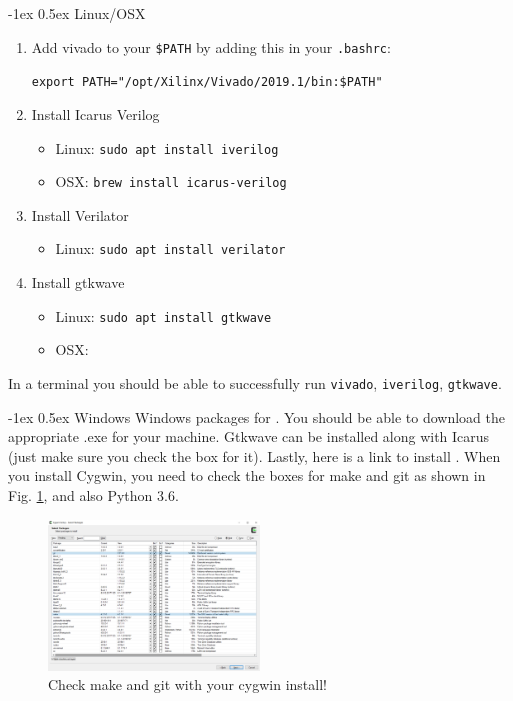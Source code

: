 \documentclass[11pt]{article}
\makeatletter
\renewcommand{\subsection}
{\@startsection {subsection}{1}{0pt}
 {-1ex}
 {0.5ex}
 {\bfseries\normalsize}}
\makeatother
\begin{document}
\subsection{Linux/OSX}
\begin{enumerate}
  \item Add vivado to your \verb|$PATH| by adding this in your \verb|.bashrc|:

    \verb|export PATH="/opt/Xilinx/Vivado/2019.1/bin:$PATH"|
  \item Install Icarus Verilog
    \begin{itemize}
      \item Linux: \verb|sudo apt install iverilog|
      \item OSX: \verb|brew install icarus-verilog|
    \end{itemize}

  \item Install Verilator
    \begin{itemize}
      \item Linux: \verb|sudo apt install verilator|
    \end{itemize}

  \item Install gtkwave
    \begin{itemize}
      \item Linux: \verb|sudo apt install gtkwave|
      \item OSX: \href{https://sourceforge.net/projects/gtkwave/files/gtkwave-3.3.100-osx-app/gtkwave.zip/download}{\color{blue}{Download the app}}
    \end{itemize}
\end{enumerate}

In a terminal you should be able to successfully run \verb|vivado|, \verb|iverilog|, \verb|gtkwave|.

\subsection{Windows}
Windows packages for \href{http://bleyer.org/icarus/}{\color{blue}{Icarus are available}}. You should be able to download the appropriate .exe for your machine. Gtkwave can be installed along with Icarus (just make sure you check the box for it). Lastly, here is a link to install \href{https://www.cygwin.com/install.html}{\color{blue}{Cygwin}}. When you install Cygwin, you need to check the boxes for make and git as shown in Fig. \ref{fig:cygwin}, and also Python 3.6.

\begin{figure}[ht]
  \centering
  \includegraphics[width=0.5\textwidth]{figs/cygwin_install.png}
  \caption{Check make and git with your cygwin install!}
  \label{fig:cygwin}
\end{figure}
\end{document}
